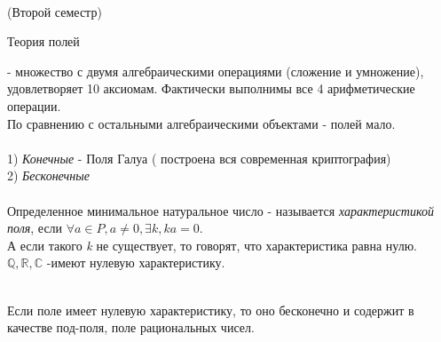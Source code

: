 
\begin{center}
 \\
\LARGE{(Второй семестр)} \\

\end{center}

\begin{title}
	{Теория полей}
\end{title}

 - множество с двумя алгебраическими операциями (сложение и умножение),
удовлетворяет 10 аксиомам. Фактически выполнимы все 4 арифметические операции.\\

По сравнению с остальными алгебраическими объектами - полей мало. \\

\\
1) {\emph {Конечные}} - Поля Галуа ( построена вся современная криптография)\\
2) {\emph {Бесконечные}} \\

\\
Определенное минимальное натуральное число  - называется {\emph
{характеристикой поля}}, если $\forall \mathit{a} \in \mathit {P,a} \neq 0,
\exists \mathit {k}, \mathit{ka} = 0 $. \\
А если такого {\emph {k}} не существует, то говорят, что характеристика равна
нулю.\\

$\mathbb{Q, R, C}$ -имеют нулевую характеристику.\\

 \\

\begin{theorem}
	Если поле имеет нулевую характеристику, то оно бесконечно и содержит в
	качестве под-поля, поле рациональных чисел.
\end{theorem}

